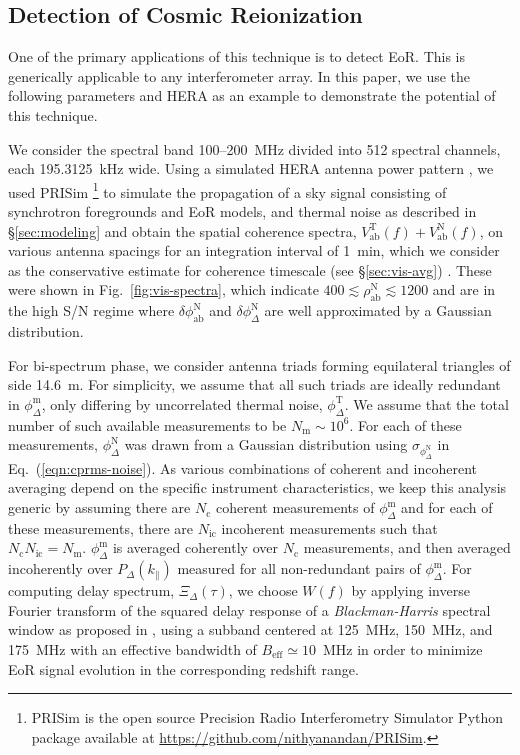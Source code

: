 \documentclass[
reprint,
superscriptaddress,
amsmath,
amssymb,
aps,
prd
]{revtex4-1}
\begin{document}
\subsection{Detection of Cosmic Reionization}\label{sec:EoR-detection}

One of the primary applications of this technique is to detect EoR. This is generically applicable to any interferometer array. In this paper, we use the following parameters and HERA as an example to demonstrate the potential of this technique.

We consider the spectral band 100--200~MHz divided into 512 spectral channels, each 195.3125~kHz wide. Using a simulated HERA antenna power pattern \cite{deb17}, we used PRISim \footnote{PRISim is the open source Precision Radio Interferometry Simulator Python package available at \href{https://github.com/nithyanandan/PRISim}{https://github.com/nithyanandan/PRISim}.} to simulate the propagation of a sky signal consisting of synchrotron foregrounds and EoR models, and thermal noise as described in \S\ref{sec:modeling} and obtain the spatial coherence spectra, $V_\textrm{ab}^\textrm{T}(f) + V_\textrm{ab}^\textrm{N}(f)$, on various antenna spacings for an integration interval of 1~min, which we consider as the conservative estimate for coherence timescale (see \S\ref{sec:vis-avg}) \cite{car18}. These were shown in Fig.~\ref{fig:vis-spectra}, which indicate $400\lesssim \rho_\textrm{ab}^\textrm{N} \lesssim 1200$ and are in the high S/N regime where $\delta\phi_\textrm{ab}^\textrm{N}$ and $\delta\phi_\Delta^\textrm{N}$ are well approximated by a Gaussian distribution. 

For bi-spectrum phase, we consider antenna triads forming equilateral triangles of side 14.6~m. For simplicity, we assume that all such triads are ideally redundant in $\phi_\Delta^\textrm{m}$, only differing by uncorrelated thermal noise, $\phi_\Delta^\textrm{T}$. We assume that the total number of such available measurements to be $N_\textrm{m} \sim 10^6$. For each of these measurements, $\phi_\Delta^\textrm{N}$ was drawn from a Gaussian distribution using $\sigma_{\phi_\Delta^\textrm{N}}$ in Eq.~(\ref{eqn:cprms-noise}). As various combinations of coherent and incoherent averaging depend on the specific instrument characteristics, we keep this analysis generic by assuming there are $N_\textrm{c}$ coherent measurements of $\phi_\Delta^\textrm{m}$ and for each of these measurements, there are $N_\textrm{ic}$ incoherent measurements such that $N_\textrm{c}N_\textrm{ic}=N_\textrm{m}$. $\phi_\Delta^\textrm{m}$ is averaged coherently over $N_\textrm{c}$ measurements, and then averaged incoherently over $P_\Delta(k_\parallel)$ measured for all non-redundant pairs of $\phi_\Delta^\textrm{m}$. For computing delay spectrum, $\Xi_\Delta(\tau)$, we choose $W(f)$ by applying inverse Fourier transform of the squared delay response of a {\it Blackman-Harris} spectral window \cite{har78} as proposed in \cite{thy16}, using a subband centered at 125~MHz, 150~MHz, and 175~MHz with an effective bandwidth of $B_\textrm{eff}\simeq 10$~MHz in order to minimize EoR signal evolution in the corresponding redshift range.
\end{document}
